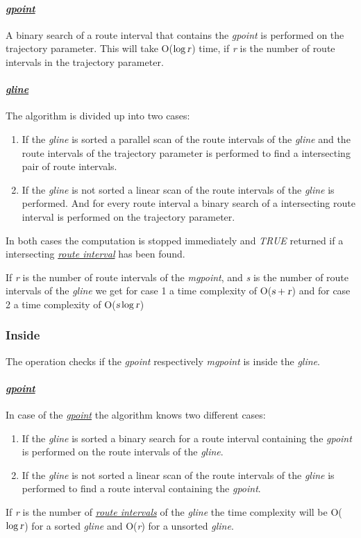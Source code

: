 \documentclass[a4paper]{article}
\newcommand{\var}[1]{\textsl{#1}}
\newcommand{\dt}[1]{\textsl{\underline{#1}}}
\newcommand{\true}{\var{TRUE}}
\begin{document}
\paragraph{\dt{gpoint}}
A binary search of a route interval that contains the \var{gpoint} is performed on the trajectory parameter. This will take O($\log \var{r}$) time, if \var{r} is the number of route intervals in the trajectory parameter.
\paragraph{\dt{gline}}
The algorithm is divided up into two cases:
\begin{enumerate}
\item If the \var{gline} is sorted a parallel scan of the route intervals of the \var{gline} and the route intervals of the trajectory parameter is performed to find a intersecting pair of route intervals.
\item If the \var{gline} is not sorted a linear scan of the route intervals of the \var{gline} is performed. And for every route interval a binary search of a intersecting route interval is performed on the trajectory parameter.
\end{enumerate}
In both cases the computation is stopped immediately and \true{} returned if a intersecting \dt{route interval} has been found.

If \var{r} is the number of route intervals of the \var{mgpoint}, and \var{s} is the number of route intervals of the \var{gline} we get for case 1 a time complexity of O($\var{s}+\var{r}$) and for case 2 a time complexity of O($\var{s} \log \var{r}$)
\subsubsection{Inside}
The operation checks if the \var{gpoint} respectively \var{mgpoint} is inside the \var{gline}.
\paragraph{\dt{gpoint}}
In case of the \dt{gpoint} the algorithm knows two different cases:
\begin{enumerate}
\item If the \var{gline} is sorted a binary search for a route interval containing the \var{gpoint} is performed on the route intervals of the \var{gline}.
\item If the \var{gline} is not sorted a linear scan of the route intervals of the \var{gline} is performed to find a route interval containing the \var{gpoint}.
\end{enumerate}
If \var{r} is the number of \dt{route intervals} of the \var{gline} the time complexity will be O($\log \var{r}$) for a sorted \var{gline} and O(\var{r}) for a unsorted \var{gline}.
\end{document}
